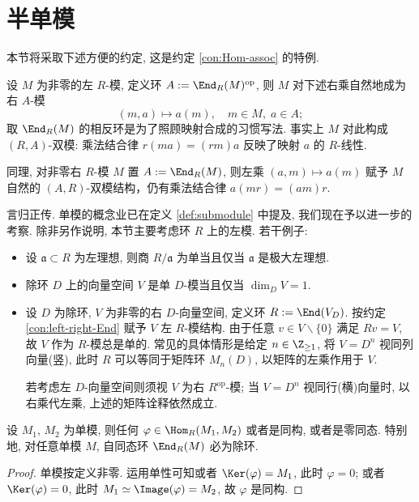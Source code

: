 \section{半单模}
本节将采取下述方便的约定, 这是约定 \ref{con:Hom-assoc} 的特例.
\begin{convention}\label{con:left-right-End}
	设 $M$ 为非零的左 $R$-模, 定义环 $A := \End_R(M)^\text{op}$, 则 $M$ 对下述右乘自然地成为右 $A$-模
	\[ (m, a) \mapsto a(m), \quad m \in M, \; a \in A;  \]
	取 $\End_R(M)$ 的相反环是为了照顾映射合成的习惯写法. 事实上 $M$ 对此构成 $(R,A)$-双模: 乘法结合律 $r(ma) = (rm)a$ 反映了映射 $a$ 的 $R$-线性.

	同理, 对非零右 $R$-模 $M$ 置 $A := \End_R(M)$, 则左乘 $(a, m) \mapsto a(m)$ 赋予 $M$ 自然的 $(A,R)$-双模结构，仍有乘法结合律 $a(mr) = (am)r$.
\end{convention}

言归正传. 单模的概念业已在定义 \ref{def:submodule} 中提及, 我们现在予以进一步的考察. 除非另作说明, 本节主要考虑环 $R$ 上的左模. 若干例子:
\begin{itemize}
	\item 设 $\mathfrak{a} \subset R$ 为左理想, 则商 $R/\mathfrak{a}$ 为单当且仅当 $\mathfrak{a}$ 是极大左理想.
	\item 除环 $D$ 上的向量空间 $V$ 是单 $D$-模当且仅当 $\dim_D V = 1$.
	\item 设 $D$ 为除环, $V$ 为非零的右 $D$-向量空间, 定义环 $R := \End(V_D)$. 按约定 \ref{con:left-right-End} 赋予 $V$ 左 $R$-模结构. 由于任意 $v \in V \smallsetminus \{0\}$ 满足 $Rv = V$, 故 $V$ 作为 $R$-模总是单的. 常见的具体情形是给定 $n \in \Z_{\geq 1}$, 将 $V = D^n$ 视同列向量(竖), 此时 $R$ 可以等同于矩阵环 $M_n(D)$, 以矩阵的左乘作用于 $V$.

	若考虑左 $D$-向量空间则须视 $V$ 为右 $R^\text{op}$-模; 当 $V = D^n$ 视同行(横)向量时, 以右乘代左乘, 上述的矩阵诠释依然成立. 
\end{itemize}

\begin{lemma}[Schur 引理]\label{prop:Schur-mod}
	设 $M_1$, $M_2$ 为单模, 则任何 $\varphi \in \Hom_R(M_1, M_2)$ 或者是同构, 或者是零同态. 特别地, 对任意单模 $M$, 自同态环 $\End_R(M)$ 必为除环.
\end{lemma}
\begin{proof}
	单模按定义非零. 运用单性可知或者 $\Ker(\varphi) = M_1$, 此时 $\varphi=0$; 或者 $\Ker(\varphi)=0$, 此时 $M_1 \simeq \Image(\varphi) = M_2$, 故 $\varphi$ 是同构. 
\end{proof}

